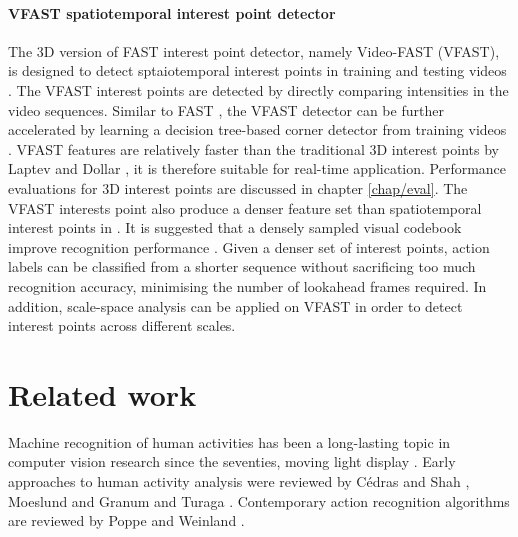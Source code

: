 \paragraph{VFAST spatiotemporal interest point detector} 
The 3D version of FAST interest point detector, namely Video-FAST (VFAST), is designed to detect sptaiotemporal interest points in training and testing videos \cite{Yu2013b}.   
The VFAST interest points are detected by directly comparing intensities in the video sequences.
Similar to FAST \cite{Rosten2010}, the VFAST detector can be further accelerated by learning a decision tree-based corner detector from training videos \cite{Rosten2010}. 
VFAST features are relatively faster than the traditional 3D interest points by Laptev \cite{Laptev2005} and Dollar \etal \cite{Dollar2005}, it is therefore suitable for real-time application. Performance evaluations for 3D interest points are discussed in chapter \ref{chap/eval}.  
The VFAST interests point also produce a denser feature set than spatiotemporal interest points in \cite{Laptev2005, Dollar2005}. It is suggested that a densely sampled visual codebook improve recognition performance \cite{Nowak2006}. 
Given a denser set of interest points, action labels can be classified from a shorter sequence without sacrificing too much recognition accuracy, minimising the number of lookahead frames required. 
In addition, scale-space analysis can be applied on VFAST in order to detect interest points across different scales.



\section{Related work}
\label{sec/act/relatedwork}

Machine recognition of human activities has been a long-lasting topic in computer vision research since the seventies, \eg moving light display \cite{Johansson1973}. Early approaches to human activity analysis were reviewed by C\'edras and Shah \cite{Cedras1995}, Moeslund and Granum \cite{Moeslund2001} and Turaga \etal \cite{Turaga2008}. Contemporary action recognition algorithms are reviewed by Poppe \cite{Poppe2010} and Weinland \etal \cite{Weinland2011}.   

